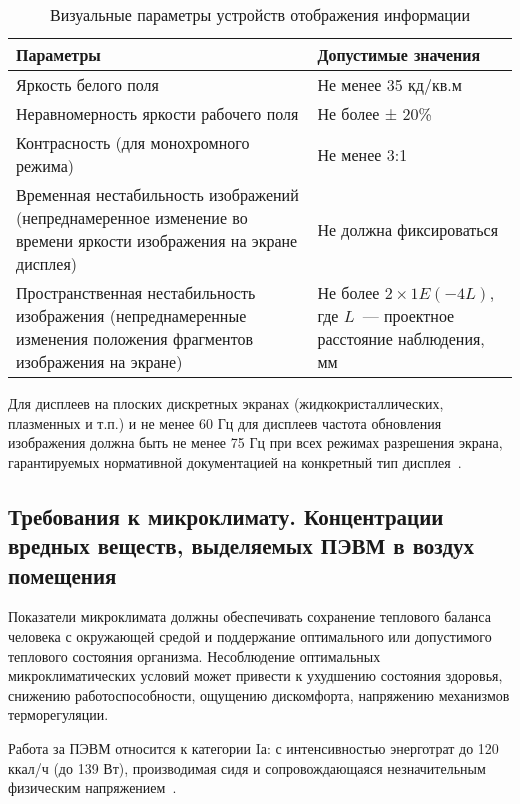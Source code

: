 \begin{table}[h!]
\caption{ Визуальные параметры устройств отображения информации }
\label{tab:life_4}
\begin{center}
\begin{tabularx}{\linewidth}{|>{\hsize=0.7\hsize}X|>{\hsize=0.3\hsize}X|}
\hline
Параметры & Допустимые значения\\
\hline
Яркость белого поля & Не менее 35 кд/кв.м\\
\hline
Неравномерность яркости рабочего поля & Не более ± 20\%\\
\hline
Контрасность (для монохромного режима) & Не менее 3:1\\
\hline
Временная нестабильность изображений (непреднамеренное изменение во времени яркости 
изображения на экране дисплея) & Не должна фиксироваться\\
\hline
Пространственная нестабильность изображения (непреднамеренные изменения 
положения фрагментов изображения на экране)& Не более $2\times1E(-4L)$, где $L$~--- проектное расстояние наблюдения, мм\\
\hline
\end{tabularx}
\end{center}
\end{table}

Для дисплеев на плоских дискретных экранах (жидкокристаллических, плазменных и т.п.) и не менее 60 Гц 
для дисплеев частота обновления изображения должна быть не менее 75 Гц при всех режимах 
разрешения экрана, гарантируемых нормативной документацией на конкретный тип дисплея~\cite{sanpin_2.4.1340-03}.


\subsection{Требования к микроклимату. Концентрации вредных веществ, выделяемых ПЭВМ в воздух помещения}


 Показатели микроклимата должны обеспечивать сохранение теплового баланса человека с окружающей средой и 
 поддержание оптимального или допустимого теплового состояния организма.
 Несоблюдение оптимальных микроклиматических условий может привести к ухудшению состояния здоровья,
 снижению работоспособности, ощущению дискомфорта, напряжению механизмов терморегуляции.
 
 Работа за ПЭВМ относится к категории Iа: с интенсивностью энерготрат до 120 ккал/ч (до 139 Вт), 
 производимая сидя и сопровождающаяся незначительным физическим напряжением~\cite{sanpin_mikroclimate}.
 

